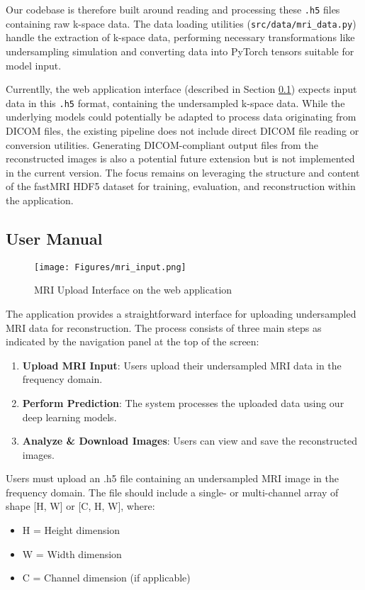 \documentclass[
	letterpaper, %
]{jdf}
\begin{document}
Our codebase is therefore built around reading and processing these \texttt{.h5} files containing raw k-space data. The data loading utilities (\texttt{src/data/mri\_data.py}) handle the extraction of k-space data, performing necessary transformations like undersampling simulation and converting data into PyTorch tensors suitable for model input.

Currentlly, the web application interface (described in Section \ref{sec:user_manual}) expects input data in this \texttt{.h5} format, containing the undersampled k-space data. While the underlying models could potentially be adapted to process data originating from DICOM files, the existing pipeline does not include direct DICOM file reading or conversion utilities. Generating DICOM-compliant output files from the reconstructed images is also a potential future extension but is not implemented in the current version. The focus remains on leveraging the structure and content of the fastMRI HDF5 dataset for training, evaluation, and reconstruction within the application.

\subsection{User Manual}\label{sec:user_manual}

\begin{figure}[ht]
\begin{center}
   \texttt{[image: Figures/mri\_input.png]}
\end{center}
\caption{MRI Upload Interface on the web application}
\label{fig}
\end{figure}


The application provides a straightforward interface for uploading undersampled MRI data for reconstruction. The process consists of three main steps as indicated by the navigation panel at the top of the screen:
\begin{enumerate}
    \item \textbf{Upload MRI Input}: Users upload their undersampled MRI data in the frequency domain.
    \item \textbf{Perform Prediction}: The system processes the uploaded data using our deep learning models.
    \item \textbf{Analyze \& Download Images}: Users can view and save the reconstructed images.
\end{enumerate}

Users must upload an .h5 file containing an undersampled MRI image in the frequency domain. The file should include a single- or multi-channel array of shape [H, W] or [C, H, W], where:
\begin{itemize}
    \item H = Height dimension
    \item W = Width dimension
    \item C = Channel dimension (if applicable)
\end{itemize}
\end{document}
